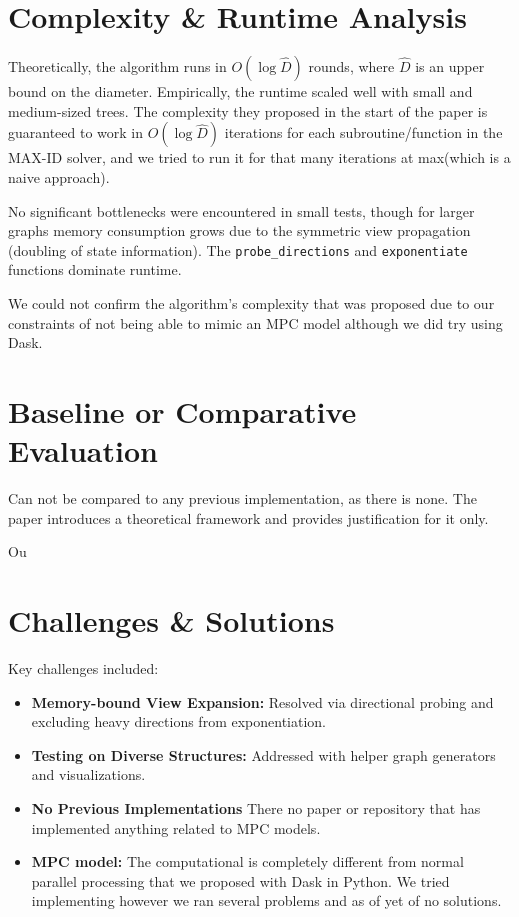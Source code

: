 \documentclass[12pt]{article}
\begin{document}
\section*{Complexity \& Runtime Analysis}
Theoretically, the algorithm runs in $O(\log \hat{D})$ rounds, where $\hat{D}$ is an upper bound on the diameter. Empirically, the runtime scaled well with small and medium-sized trees. The complexity they proposed in the start of the paper is guaranteed to work in $O(\log \hat{D})$ iterations for each subroutine/function in the MAX-ID solver, and we tried to run it for that many iterations at max(which is a naive approach). 

No significant bottlenecks were encountered in small tests, though for larger graphs memory consumption grows due to the symmetric view propagation (doubling of state information). The \texttt{probe\_directions} and \texttt{exponentiate} functions dominate runtime.

We could not confirm the algorithm's complexity that was proposed due to our constraints of not being able to mimic an MPC model although we did try using Dask.

\section*{Baseline or Comparative Evaluation}
Can not be compared to any previous implementation, as there is none. The paper introduces a theoretical framework and provides justification for it only.

Ou

\section*{Challenges \& Solutions}
Key challenges included:
\begin{itemize}
    \item \textbf{Memory-bound View Expansion:} Resolved via directional probing and excluding heavy directions from exponentiation.
    \item \textbf{Testing on Diverse Structures:} Addressed with helper graph generators and visualizations.
    \item \textbf{No Previous Implementations} There no paper or repository that has implemented anything related to MPC models.
    \item \textbf{MPC model:} The computational is completely different from normal parallel processing that we proposed with Dask in Python. We tried implementing however we ran several problems and as of yet of no solutions.
\end{itemize}
\end{document}
